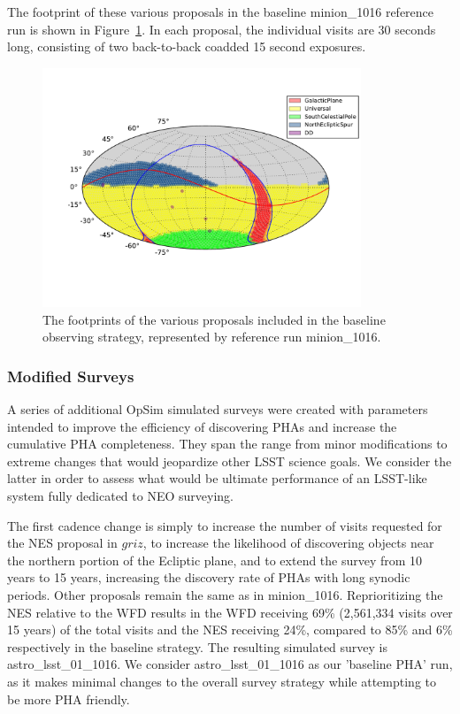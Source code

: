 The footprint of these various proposals in the baseline minion\_1016 reference run is shown in Figure~\ref{fig:minion_footprints}. In each proposal, the individual visits are 30 seconds long, consisting of two back-to-back coadded 15 second exposures. 

\begin{figure}[t!]
\centering
\includegraphics[width=0.85\textwidth]{figures/minion_1016_proposal_footprint}
\vskip -1.0in
\caption{The footprints of the various proposals included in the baseline observing strategy, represented by reference run minion\_1016. 
\label{fig:minion_footprints}}
\end{figure}


\subsubsection{Modified Surveys} 

A series of additional OpSim simulated surveys were created with parameters intended to improve the efficiency of discovering PHAs and increase the cumulative PHA completeness. They span the range from minor modifications to extreme changes that would
jeopardize other LSST science goals. We consider the latter in order to assess what would be ultimate performance of an 
LSST-like system fully dedicated to NEO surveying. 

The first cadence change is simply to increase the number of visits requested for the NES proposal in $griz$, to increase the likelihood of discovering objects near the northern portion of the Ecliptic plane, and to extend the survey from 10 years to 15 years, increasing the discovery rate of PHAs with long synodic periods. Other proposals remain the same as in minion\_1016. Reprioritizing the NES relative to the WFD results in the WFD receiving 69\% (2,561,334 visits over 15 years) of the total visits and the NES receiving 24\%, compared to 85\% and 6\% respectively in the baseline strategy. The resulting simulated survey is astro\_lsst\_01\_1016.  We consider astro\_lsst\_01\_1016 as our 'baseline PHA' run, as it makes minimal changes to the overall survey strategy while attempting to be more PHA friendly. 

